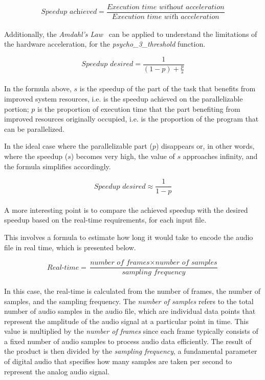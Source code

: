 \begin{equation}
    \textit{Speedup achieved} = \frac{\textit{Execution time without acceleration}}{\textit{Execution time with acceleration}} 
\end{equation}\\

Additionally, the \textit{Amdahl's Law}~\cite{amdahl} can be applied to understand the limitations of the hardware acceleration, for the \textit{psycho\_3\_threshold} function.

\begin{equation}
    \textit{Speedup desired} = \frac{1}{(1 - p) + \frac{p}{s}} 
\end{equation}\\

In the formula above, $s$ is the speedup of the part of the task that benefits from improved system resources, i.e. is the speedup achieved on the parallelizable portion; $p$ is the proportion of execution time that the part benefiting from improved resources originally occupied, i.e. is the proportion of the program that can be parallelized.

In the ideal case where the parallelizable part ($p$) disappears or, in other words, where the speedup ($s$) becomes very high, the value of $s$ approaches infinity, and the formula simplifies accordingly.

\begin{equation}
    \textit{Speedup desired} \approx \frac{1}{1 - p}
\end{equation}\\

A more interesting point is to compare the achieved speedup with the desired speedup based on the real-time requirements, for each input file. 

This involves a formula to estimate how long it would take to encode the audio file in real time, which is presented below.

\begin{equation}
    \textit{Real-time} = \frac{\textit{number of frames} \times \textit{number of samples}}{\textit{sampling frequency}} 
\end{equation}\\

In this case, the real-time is calculated from the number of frames, the number of samples, and the sampling frequency.
The \textit{number of samples} refers to the total number of audio samples in the audio file, which are individual data points that represent the amplitude of the audio signal at a particular point in time. This value is multiplied by the \textit{number of frames} since each frame typically consists of a fixed number of audio samples to process audio data efficiently. The result of the product is then divided by the \textit{sampling frequency}, a fundamental parameter of digital audio that specifies how many samples are taken per second to represent the analog audio signal.

